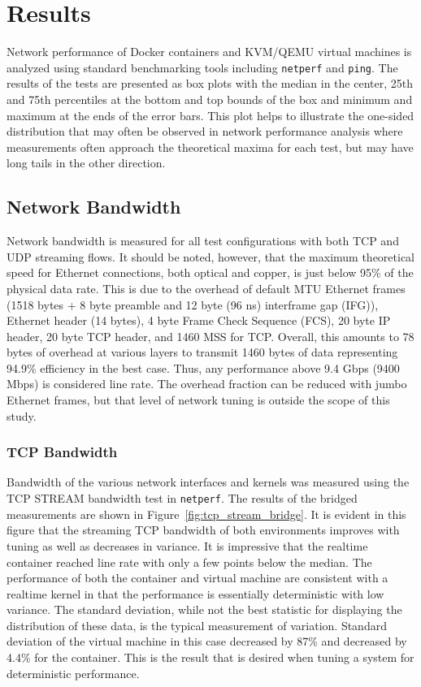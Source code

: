 \chapter{Results}
\label{sec:results}
Network performance of Docker containers and KVM/QEMU virtual machines is analyzed using standard benchmarking tools including \texttt{netperf} and \texttt{ping}.  
The results of the tests are presented as box plots with the median in the center, 25th and 75th percentiles at the bottom and top bounds of the box and minimum and maximum at the ends of the error bars.
This plot helps to illustrate the one-sided distribution that may often be observed in network performance analysis where measurements often approach the theoretical maxima for each test, but may have long tails in the other direction.  

\section{Network Bandwidth} %
\label{sec:networkbandwidth}
Network bandwidth is measured for all test configurations with both TCP and UDP streaming flows.
It should be noted, however, that the maximum theoretical speed for Ethernet connections, both optical and copper, is just below 95\% of the physical data rate.
This is due to the overhead of default MTU Ethernet frames (1518 bytes + 8 byte preamble and 12 byte (96 ns) interframe gap (IFG)), Ethernet header (14 bytes), 4 byte Frame Check Sequence (FCS), 20 byte IP header, 20 byte TCP header, and 1460 MSS for TCP.
Overall, this amounts to 78 bytes of overhead at various layers to transmit 1460 bytes of data representing 94.9\% efficiency in the best case.  
Thus, any performance above 9.4 Gbps (9400 Mbps) is considered line rate.  
The overhead fraction can be reduced with jumbo Ethernet frames, but that level of network tuning is outside the scope of this study.

\subsection{TCP Bandwidth} %
\label{sub:tcpbandwidth}
Bandwidth of the various network interfaces and kernels was measured using the TCP STREAM bandwidth test in \texttt{netperf}.
The results of the bridged measurements are shown in Figure~\ref{fig:tcp_stream_bridge}. 
It is evident in this figure that the streaming TCP bandwidth of both environments improves with tuning as well as decreases in variance.  
It is impressive that the realtime container reached line rate with only a few points below the median.  
The performance of both the container and virtual machine are consistent with a realtime kernel in that the performance is essentially deterministic with low variance.
The standard deviation, while not the best statistic for displaying the distribution of these data, is the typical measurement of variation.
Standard deviation of the virtual machine in this case decreased by 87\% and decreased by 4.4\% for the container.  
This is the result that is desired when tuning a system for deterministic performance.


